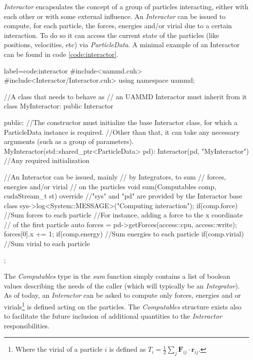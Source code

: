 \documentclass[twoside,openright,titlepage,numbers=noenddot,%
headinclude,footinclude,cleardoublepage=empty,abstract=on,
BCOR=5mm,fontsize=11pt, dvipsnames, paper=b5
]{scrreprt}
\renewcommand{\vec}[1]{\bm{#1}}
\newcommand{\half}{\frac{1}{2}}
\begin{document}
\emph{Interactor} encapsulates the concept of a group of particles interacting, either with each other or with some external influence.
An \emph{Interactor} can be issued to compute, for each particle, the forces, energies and/or virial due to a certain interaction.
To do so it can access the current state of the particles (like positions, velocities, etc) via \emph{ParticleData}.
A minimal example of an Interactor can be found in code \ref{code:interactor}.
\begin{code2}
  {label=code:interactor}
#include<uammd.cuh>
#include<Interactor/Interactor.cuh>
using namespace uammd;

//A class that needs to behave as 
// an UAMMD Interactor must inherit from it
class MyInteractor: public Interactor{
  public:
  //The constructor must initialize the base Interactor class, for which a ParticleData instance is required.
  //Other than that, it can take any necessary arguments (such as a group of parameters).
  MyInteractor(std::shared_ptr<ParticleData> pd):
          Interactor(pd, "MyInteractor"){
    //Any required initialization 
  }

  //An Interactor can be issued, mainly
  // by Integrators, to sum
  // forces, energies and/or virial
  // on the particles
  void sum(Computables comp, cudaStream_t st) override{
    //"sys" and "pd" are provided by the Interactor base class
    sys->log<System::MESSAGE>("Computing interaction");
    if(comp.force){
      //Sum forces to each particle
      //For instance, adding a force to the x coordinate
      // of the first particle
      auto forces = pd->getForces(access::cpu, access::write);
      forces[0].x += 1;
    }
    if(comp.energy){
      //Sum energies to each particle
    }
    if(comp.virial){
      //Sum virial to each particle
    }
  }
};

\end{code2}

The \emph{Computables} type in the \emph{sum} function simply contains a list of boolean values describing the needs of the caller (which will typically be an \emph{Integrator}). As of today, an \emph{Interactor} can be asked to compute only forces, energies and or virials\footnote{Where the virial of a particle $i$ is defined as $T_i=\half\sum_j\vec{F}_{ij}\cdot\vec{r}_{ij}$.} is defined acting on the particles. The \emph{Computables} structure exists also to facilitate the future inclusion of additional quantities to the \emph{Interactor} responsibilities.
\end{document}
